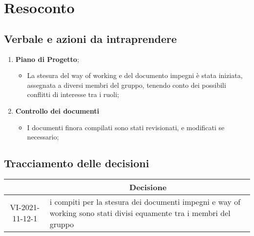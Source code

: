 \section{Resoconto}
\subsection{Verbale e azioni da intraprendere}

\begin{enumerate}
	\item \textbf{Piano di Progetto};
	\begin{itemize}
		\item La stesura del way of working e del documento impegni è stata iniziata, assegnata a diversi membri del gruppo, tenendo conto dei possibili conflitti di interesse tra i ruoli;
	\end{itemize}
	\item \textbf{Controllo dei documenti}
	\begin{itemize}
		\item I documenti finora compilati sono stati revisionati, e modificati se necessario;
	\end{itemize}
\end{enumerate}

\pagebreak

\subsection{Tracciamento delle decisioni}

\begin{table}[H]
	\centering
	\renewcommand{\arraystretch}{1.8}
	\begin{tabular}{c | p{10cm}}
		\rowcolor[HTML]{125E28}
		\multicolumn{1}{c}{\color[HTML]{FFFFFF} \textbf{ID}} &
		\multicolumn{1}{c}{\color[HTML]{FFFFFF} \textbf{Decisione}} \\
		\hline
		VI-2021-11-12-1 & i compiti per la stesura dei documenti impegni e way of working sono stati divisi equamente tra i membri del gruppo  \\ \hline
	\end{tabular}
\end{table}